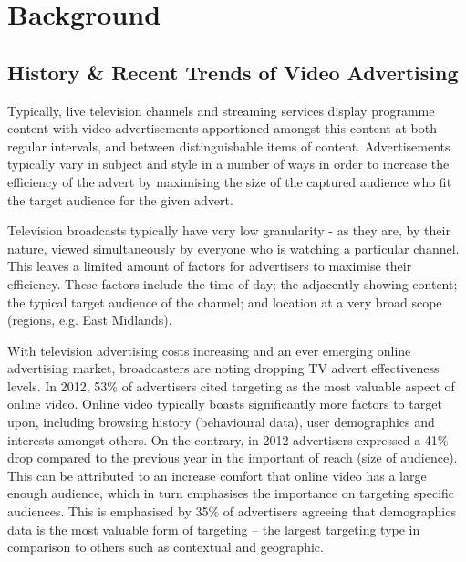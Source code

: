 \section{Background}

	\subsection{History \& Recent Trends of Video Advertising}

	Typically, live television channels and streaming services display programme content with video advertisements apportioned amongst this content at both regular intervals, and between distinguishable items of content. Advertisements typically vary in subject and style in a number of ways in order to increase the efficiency of the advert by maximising the size of the captured audience who fit the target audience for the given advert.

	Television broadcasts typically have very low granularity - as they are, by their nature, viewed simultaneously by everyone who is watching a particular channel. This leaves a limited amount of factors for advertisers to maximise their efficiency. These factors include the time of day; the adjacently showing content; the typical target audience of the channel; and location at a very broad scope (regions, e.g. East Midlands).

	With television advertising costs increasing and an ever emerging online advertising market, broadcasters are noting dropping TV advert effectiveness levels. In 2012, 53\% of advertisers cited targeting as the most valuable aspect of online video. Online video typically boasts significantly more factors to target upon, including browsing history (behavioural data), user demographics and interests amongst others. On the contrary, in 2012 advertisers expressed a 41\% drop compared to the previous year in the important of reach (size of audience). This can be attributed to an increase comfort that online video has a large enough audience, which in turn emphasises the importance on targeting specific audiences. This is emphasised by 35\% of advertisers agreeing that demographics data is the most valuable form of targeting -- the largest targeting type in comparison to others such as contextual and geographic. \citep{brightroll-report}


